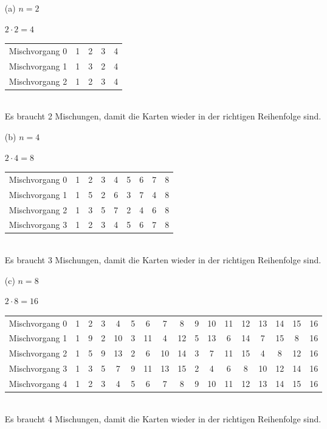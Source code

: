 \documentclass{article} %
\begin{document}
\begin{enumerate}
    \item[(a)] $n = 2$
    \begin{mybox}
    $ 2 \cdot 2 = 4$ \\ \newline
        \begin{tabular}{c|cccc}
            Mischvorgang 0 & 1 & 2& 3& 4\\
            Mischvorgang 1 & 1 & 3 & 2 & 4 \\
            Mischvorgang 2 & 1 & 2 & 3 & 4
        \end{tabular} \\ \newline
    Es braucht 2 Mischungen, damit die Karten wieder in der richtigen Reihenfolge sind. 
    \end{mybox}
    \item[(b)] $n = 4$
    \begin{mybox}
     $ 2 \cdot 4 = 8$ \\ \newline
     \begin{tabular}{c|cccccccc}
        Mischvorgang 0  &1&2&3&4&5&6&7&8 \\
        Mischvorgang 1  &1&5&2&6&3&7&4&8  \\
        Mischvorgang 2 &1&3&5&7&2&4&6&8  \\
        Mischvorgang 3 &1&2&3&4&5&6&7&8  \\
     \end{tabular} \\ \newline
     Es braucht 3 Mischungen, damit die Karten wieder in der richtigen Reihenfolge sind.
    \end{mybox}
    \item[(c)] $n = 8$
\begin{mybox}
  $ 2 \cdot 8 = 16$ \\ \newline
     \begin{tabular}{c|cccccccccccccccc}
        Mischvorgang 0  &1&2&3&4&5&6&7&8&9&10&11&12&13&14&15&16 \\
        Mischvorgang 1  &1&9&2&10&3&11&4&12&5&13&6&14&7&15&8&16  \\
        Mischvorgang 2 &1&5&9&13&2&6&10&14&3&7&11&15&4&8&12&16  \\
        Mischvorgang 3 &1&3&5&7&9&11&13&15&2&4&6&8&10&12&14&16  \\
        Mischvorgang 4 &1&2&3&4&5&6 &7 & 8&9&10&11&12&13&14&15&16  \\
     \end{tabular} \\ \newline
     Es braucht 4 Mischungen, damit die Karten wieder in der richtigen Reihenfolge sind.
\end{mybox}
\end{enumerate}
\end{document}
